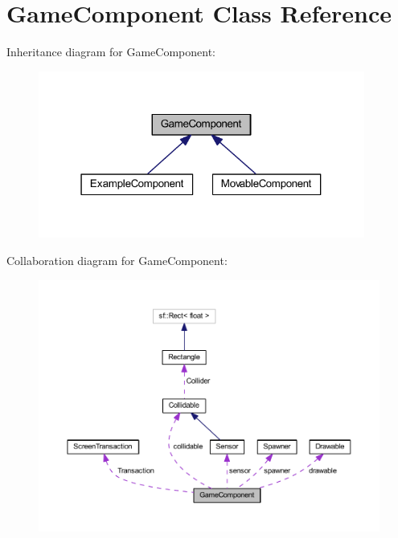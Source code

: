 \hypertarget{class_game_component}{\section{Game\-Component Class Reference}
\label{class_game_component}
}


Inheritance diagram for Game\-Component\-:\nopagebreak
\begin{figure}[H]
\begin{center}
\leavevmode
\includegraphics[width=304pt]{class_game_component__inherit__graph}
\end{center}
\end{figure}


Collaboration diagram for Game\-Component\-:\nopagebreak
\begin{figure}[H]
\begin{center}
\leavevmode
\includegraphics[width=350pt]{class_game_component__coll__graph}
\end{center}
\end{figure}
